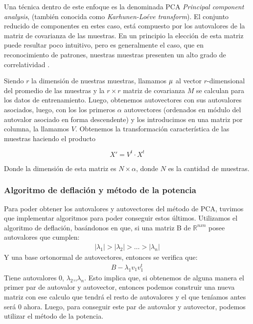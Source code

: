 \documentclass[a4paper]{article}
\begin{document}
    Una técnica dentro de este enfoque es la denominada PCA \emph{Principal component analysis}, (también conocida como \emph{Karhunen-Loéve transform}). El conjunto reducido de componentes en estes caso, está compuesto por los autovalores de la matriz de covarianza de las muestras. En un principio la elección de esta matriz puede resultar poco intuitivo, pero es generalmente el caso, que en reconocimiento de patrones, nuestras muestras presenten un alto grado de correlatividad \cite{img-proc}.
    
    Siendo $r$ la dimensión de nuestras muestras, llamamos $\boldmath{\mu}$ al vector $r$-dimensional del promedio de las muestras y la $r\times r$ matriz de covarianza $M$ se calculan para los datos de entrenamiento. Luego, obtenemos autovectores con sus autovalores asociados, luego, con los los primeros $\alpha$ autovectores (ordenados en módulo del autovalor asociado en forma descendente) y los introducimos en una matriz por columna, la llamamos $V$. Obtenemos la transformación característica de las muestras haciendo el producto
    
    \[X' = V^t \cdot X^t\]
    
    Donde la dimensión de esta matriz es $N\times \alpha$, donde $N$ es la cantidad de muestras\cite{pattern}.

        \subsubsection{Algoritmo de deflación y método de la potencia}
        Para poder obtener los autovalores y autovectores del método de PCA, tuvimos que implementar algoritmos para poder conseguir estos últimos. Utilizamos el algoritmo de deflación, basándonos en que, si una matriz B de $\mathbb{R}^{nxn}$ posee autovalores que cumplen:
        \begin{align*}
            |\lambda_1| > |\lambda_2| > \hdots > |\lambda_n|
        \end{align*}
        Y una base ortonormal de autovectores, entonces se verifica que:
        \begin{align*}
                B - \lambda_1 v_1 v^{t}_{1}
        \end{align*}
        Tiene autovalores 0, $\lambda_2$,\hdots ,$\lambda_n$. Esto implica que, si obtenemos de alguna manera el primer par de autovalor y autovector, entonces podemos construir una nueva matriz con ese calculo que tendrá el resto de autovalores y el que teníamos antes será 0 ahora. Luego, para conseguir este par de autovalor y autovector, podemos utilizar el método de la potencia. 
        
\end{document}
